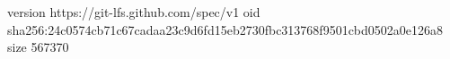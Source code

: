 version https://git-lfs.github.com/spec/v1
oid sha256:24c0574cb71c67cadaa23c9d6fd15eb2730fbc313768f9501cbd0502a0e126a8
size 567370
